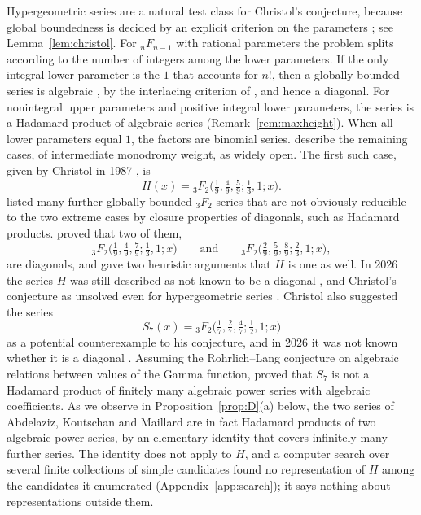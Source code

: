 \documentclass[11pt]{amsart}
\theoremstyle{definition}
\theoremstyle{remark}
\numberwithin{equation}{section}
\begin{document}
Hypergeometric series are a natural test class for Christol's conjecture, because global boundedness is decided by an explicit criterion on the parameters \citep{Christol1987}; see Lemma~\ref{lem:christol}. For ${}_nF_{n-1}$ with rational parameters the problem splits according to the number of integers among the lower parameters. If the only integral lower parameter is the $1$ that accounts for $n!$, then a globally bounded series is algebraic \citep[Theorem~33]{Christol2015}, by the interlacing criterion of \citet{BeukersHeckman1989}, and hence a diagonal. For nonintegral upper parameters and positive integral lower parameters, the series is a Hadamard product of algebraic series (Remark~\ref{rem:maxheight}). When all lower parameters equal $1$, the factors are binomial series. \citet{BostanYurkevich2022} describe the remaining cases, of intermediate monodromy weight, as widely open. The first such case, given by Christol in 1987 \citep[\S VII]{Christol1987}, is
\begin{equation}\label{eq:H}
H(x)={}_3F_2\Big(\tfrac19,\tfrac49,\tfrac59;\tfrac13,1;x\Big).
\end{equation}
\citet{BostanEtAl2013} listed many further globally bounded ${}_3F_2$ series that are not obviously reducible to the two extreme cases by closure properties of diagonals, such as Hadamard products. \citet{AbdelazizKoutschanMaillard2020} proved that two of them,
\[
{}_3F_2\big(\tfrac19,\tfrac49,\tfrac79;\tfrac13,1;x\big)\qquad\text{and}\qquad{}_3F_2\big(\tfrac29,\tfrac59,\tfrac89;\tfrac23,1;x\big),
\]
are diagonals, and gave two heuristic arguments that $H$ is one as well. In 2026 the series $H$ was still described as not known to be a diagonal \citep{CarusoFurnsinn2026b}, and Christol's conjecture as unsolved even for hypergeometric series \citep{CarusoFurnsinn2026a}. Christol also suggested the series
\begin{equation}\label{eq:S7}
S_7(x)={}_3F_2\Big(\tfrac17,\tfrac27,\tfrac47;\tfrac12,1;x\Big)
\end{equation}
as a potential counterexample to his conjecture, and in 2026 it was not known whether it is a diagonal \citep[Remark~4.2]{HarderKramerMiller2025}. Assuming the Rohrlich--Lang conjecture on algebraic relations between values of the Gamma function, \citet[Proposition~1]{RivoalRoques2014} proved that $S_7$ is not a Hadamard product of finitely many algebraic power series with algebraic coefficients. As we observe in Proposition~\ref{prop:D}(a) below, the two series of Abdelaziz, Koutschan and Maillard are in fact Hadamard products of two algebraic power series, by an elementary identity that covers infinitely many further series. The identity does not apply to $H$, and a computer search over several finite collections of simple candidates found no representation of $H$ among the candidates it enumerated (Appendix~\ref{app:search}); it says nothing about representations outside them.
\end{document}

